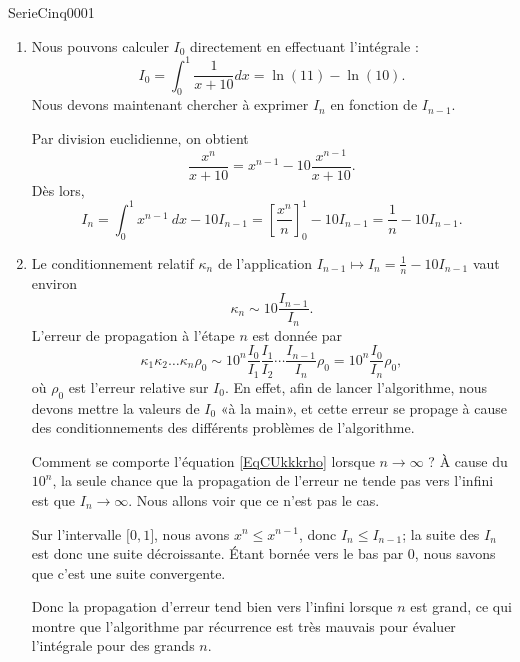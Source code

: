 
\begin{corrige}{SerieCinq0001}


	\begin{enumerate}

		\item
			Nous pouvons calculer $I_0$ directement en effectuant l'intégrale :
			\begin{equation}
				I_0=\int_0^1\frac{1}{ x+10 }dx=\ln(11)-\ln(10).
			\end{equation}
			Nous devons maintenant chercher à exprimer $I_n$ en fonction de $I_{n-1}$.

			Par division euclidienne, on obtient
			\[
				\frac{x^n}{x+10} = x^{n-1} - 10 \frac{x^{n-1}}{x+10}.
			\]
			D\`es lors,
			\[
				I_n = \int_0^1 x^{n-1} \: dx - 10 I_{n-1} = \left[ \frac{x^n}{n} \right]_0^1 - 10 I_{n-1} = \frac{1}{n} - 10 I_{n-1}.
			\]
		 \item
			 Le conditionnement relatif $\kappa_n$ de l'application $I_{n-1} \mapsto I_n = \frac{1}{n} - 10 I_{n-1}$ vaut environ
			\[
				\kappa_n \sim 10 \frac{I_{n-1}}{I_n}.
			\]
			L'erreur de propagation à l'étape $n$ est donnée par 
			\begin{equation}	\label{EqCUkkkrho}
				\kappa_1 \kappa_2 \dots \kappa_n \rho_0 \sim  10^n\frac{ I_0 }{ I_1 }\frac{ I_1 }{ I_2 }\cdots\frac{ I_{n-1} }{ I_n }\rho_0=10^n \frac{I_0}{I_n} \rho_0,
			\end{equation}
			où $\rho_0$ est l'erreur relative sur $I_0$. En effet, afin de lancer l'algorithme, nous devons mettre la valeurs de $I_0$ «à la main», et cette erreur se propage à cause des conditionnements des différents problèmes de l'algorithme.

			Comment se comporte l'équation \eqref{EqCUkkkrho} lorsque $n\to\infty$ ? À cause du $10^n$, la seule chance que la propagation de l'erreur ne tende pas vers l'infini est que $I_n\to\infty$. Nous allons voir que ce n'est pas le cas.

			Sur l'intervalle $\mathopen[ 0 , 1 \mathclose]$, nous avons $x^n\leq x^{n-1}$, donc $I_{n}\leq I_{n-1}$; la suite des \( I_n\) est donc une suite décroissante. Étant bornée vers le bas par $0$, nous savons que c'est une suite convergente.

			Donc la propagation d'erreur tend bien vers l'infini lorsque $n$ est grand, ce qui montre que l'algorithme par récurrence est très mauvais pour évaluer l'intégrale pour des grands $n$.

	\end{enumerate}
\end{corrige}
